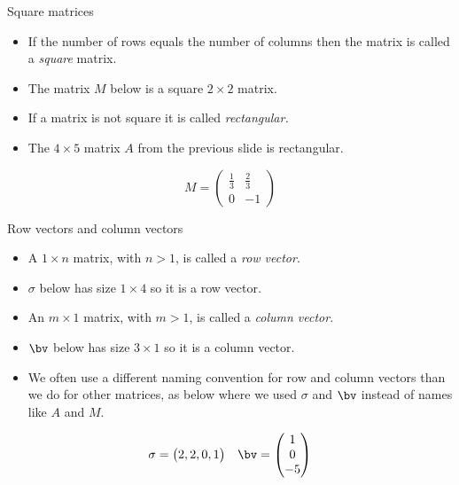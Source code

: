 \documentclass{beamer}
\begin{document}

\begin{frame}{Square matrices}

\begin{itemize}
\item If the number of rows equals the number of columns then the matrix is
called a \emph{square} matrix.
\item The matrix $M$ below is a square $2\times 2$ matrix.
\item If a matrix is not square it is called \emph{rectangular.}
\item The $4\times 5$ matrix $A$ from the previous slide is rectangular.
\end{itemize}

$$
M =
\begin{pmatrix}
\frac{1}{3} & \frac{2}{3} \\
0 & -1
\end{pmatrix}
$$

\end{frame}


\begin{frame}{Row vectors and column vectors}

\begin{itemize}
\item A $1\times n$ matrix, with $n>1$, is called a \emph{row vector}.
\item $\sigma$ below has size $1\times 4$ so it is a row vector.
\item An $m\times 1$ matrix, with $m>1$, is called a \emph{column vector}.
\item $\bv$ below has size $3\times 1$ so it is a column vector.
\item We often use a different naming convention for row and column vectors
than we do for other matrices, as below where we used $\sigma$ and $\bv$
instead of names like $A$ and $M$.
\end{itemize}

$$
\begin{matrix}
\sigma =
\begin{pmatrix}
2, 2, 0, 1
\end{pmatrix}

&

\bv =
\begin{pmatrix}
1 \\
0 \\
-5
\end{pmatrix}
\end{matrix}
$$

\end{frame}
\end{document}
